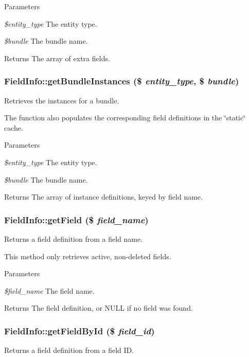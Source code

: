 \begin{DoxyParams}{Parameters}
\item[{\em \$entity\_\-type}]The entity type. \item[{\em \$bundle}]The bundle name.\end{DoxyParams}
\begin{DoxyReturn}{Returns}
The array of extra fields. 
\end{DoxyReturn}
\hypertarget{classFieldInfo_a86592a2d5a38d0212d1fe66a3d09f279}{
\subsubsection[{getBundleInstances}]{\setlength{\rightskip}{0pt plus 5cm}FieldInfo::getBundleInstances (\$ {\em entity\_\-type}, \/  \$ {\em bundle})}}
\label{classFieldInfo_a86592a2d5a38d0212d1fe66a3d09f279}
Retrieves the instances for a bundle.

The function also populates the corresponding field definitions in the \char`\"{}static\char`\"{} cache.


\begin{DoxyParams}{Parameters}
\item[{\em \$entity\_\-type}]The entity type. \item[{\em \$bundle}]The bundle name.\end{DoxyParams}
\begin{DoxyReturn}{Returns}
The array of instance definitions, keyed by field name. 
\end{DoxyReturn}
\hypertarget{classFieldInfo_ae9d200f6f749869b9e1011ac8cf641fa}{
\subsubsection[{getField}]{\setlength{\rightskip}{0pt plus 5cm}FieldInfo::getField (\$ {\em field\_\-name})}}
\label{classFieldInfo_ae9d200f6f749869b9e1011ac8cf641fa}
Returns a field definition from a field name.

This method only retrieves active, non-\/deleted fields.


\begin{DoxyParams}{Parameters}
\item[{\em \$field\_\-name}]The field name.\end{DoxyParams}
\begin{DoxyReturn}{Returns}
The field definition, or NULL if no field was found. 
\end{DoxyReturn}
\hypertarget{classFieldInfo_a833bcc6b25c50126f5bf7f13d9a2226f}{
\subsubsection[{getFieldById}]{\setlength{\rightskip}{0pt plus 5cm}FieldInfo::getFieldById (\$ {\em field\_\-id})}}
\label{classFieldInfo_a833bcc6b25c50126f5bf7f13d9a2226f}
Returns a field definition from a field ID.

